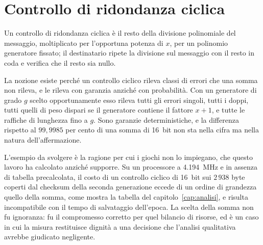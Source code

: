 \section{Controllo di ridondanza ciclica}

Un controllo di ridondanza ciclica è il resto della divisione polinomiale del messaggio, moltiplicato per l'opportuna potenza di $x$, per un polinomio generatore fissato; il destinatario ripete la divisione sul messaggio con il resto in coda e verifica che il resto sia nullo.

La nozione esiste perché un controllo ciclico rileva classi di errori che una somma non rileva, e le rileva con garanzia anziché con probabilità. Con un generatore di grado $g$ scelto opportunamente esso rileva tutti gli errori singoli, tutti i doppi, tutti quelli di peso dispari se il generatore contiene il fattore $x+1$, e tutte le raffiche di lunghezza fino a $g$. Sono garanzie deterministiche, e la differenza rispetto al $99{,}9985$ per cento di una somma di \SI{16}{bit} non sta nella cifra ma nella natura dell'affermazione.

L'esempio da svolgere è la ragione per cui i giochi non lo impiegano, che questo lavoro ha calcolato anziché supporre. Su un processore a \SI{4,194}{MHz} e in assenza di tabella precalcolata, il costo di un controllo ciclico di \SI{16}{bit} sui $2\,938$ byte coperti dal checksum della seconda generazione eccede di un ordine di grandezza quello della somma, come mostra la tabella del capitolo~\ref{cap:analisi}, e risulta incompatibile con il tempo di salvataggio dell'epoca. La scelta della somma non fu ignoranza: fu il compromesso corretto per quel bilancio di risorse, ed è un caso in cui la misura restituisce dignità a una decisione che l'analisi qualitativa avrebbe giudicato negligente.
